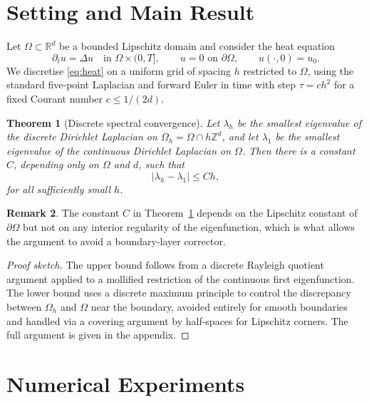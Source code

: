 \documentclass[journal=gmj]{CUP-JNL-DTM}
\newtheorem{theorem}{Theorem}[section]
\theoremstyle{definition}
\newtheorem{remark}[theorem]{Remark}
\begin{document}
\section{Setting and Main Result}

Let $\Omega \subset \mathbb{R}^d$ be a bounded Lipschitz domain and consider
the heat equation
\begin{equation}
  \partial_t u = \Delta u \quad \text{in } \Omega \times (0, T], \qquad
  u = 0 \text{ on } \partial\Omega, \qquad u(\cdot, 0) = u_0.
  \label{eq:heat}
\end{equation}
We discretise \eqref{eq:heat} on a uniform grid of spacing $h$ restricted to
$\Omega$, using the standard five-point Laplacian and forward Euler in time
with step $\tau = c h^2$ for a fixed Courant number $c \le 1/(2d)$.

\begin{theorem}[Discrete spectral convergence]
\label{thm:main}
Let $\lambda_h$ be the smallest eigenvalue of the discrete Dirichlet
Laplacian on $\Omega_h = \Omega \cap h\mathbb{Z}^d$, and let $\lambda_1$ be
the smallest eigenvalue of the continuous Dirichlet Laplacian on $\Omega$.
Then there is a constant $C$, depending only on $\Omega$ and $d$, such that
\begin{equation}
  |\lambda_h - \lambda_1| \le C h,
\end{equation}
for all sufficiently small $h$.
\end{theorem}

\begin{remark}
The constant $C$ in Theorem~\ref{thm:main} depends on the Lipschitz constant
of $\partial\Omega$ but not on any interior regularity of the eigenfunction,
which is what allows the argument to avoid a boundary-layer corrector.
\end{remark}

\begin{proof}[Proof sketch]
The upper bound follows from a discrete Rayleigh quotient argument applied to
a mollified restriction of the continuous first eigenfunction. The lower
bound uses a discrete maximum principle to control the discrepancy between
$\Omega_h$ and $\Omega$ near the boundary, avoided entirely for smooth
boundaries and handled via a covering argument by half-spaces for Lipschitz
corners. The full argument is given in the appendix.
\end{proof}

\section{Numerical Experiments}
\end{document}
